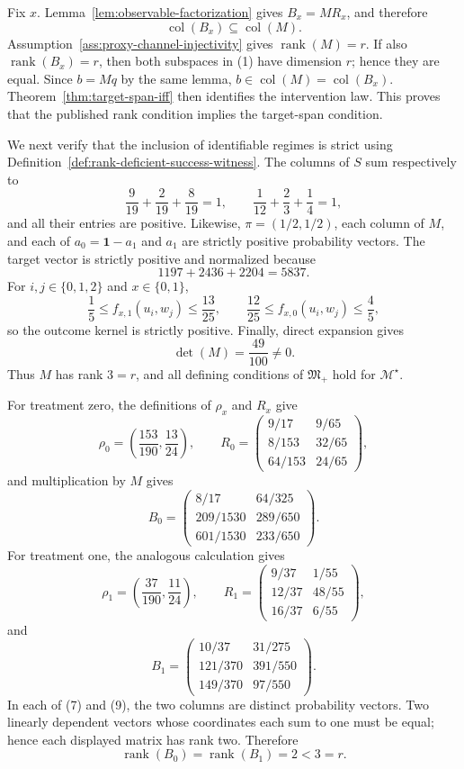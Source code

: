 Fix \(x\). Lemma~\ref{lem:observable-factorization} gives \(B_x=MR_x\), and therefore
\[
\operatorname{col}(B_x)\subseteq\operatorname{col}(M).
\tag{1}
\]
Assumption~\ref{ass:proxy-channel-injectivity} gives \(\operatorname{rank}(M)=r\). If also \(\operatorname{rank}(B_x)=r\), then both subspaces in (1) have dimension \(r\); hence they are equal. Since \(b=Mq\) by the same lemma, \(b\in\operatorname{col}(M)=\operatorname{col}(B_x)\). Theorem~\ref{thm:target-span-iff} then identifies the intervention law. This proves that the published rank condition implies the target-span condition.

We next verify that the inclusion of identifiable regimes is strict using Definition~\ref{def:rank-deficient-success-witness}. The columns of \(S\) sum respectively to
\[
\frac9{19}+\frac2{19}+\frac8{19}=1,
\qquad
\frac1{12}+\frac23+\frac14=1,
\tag{2}
\]
and all their entries are positive. Likewise, \(\pi=(1/2,1/2)\), each column of \(M\), and each of \(a_0=\mathbf 1-a_1\) and \(a_1\) are strictly positive probability vectors. The target vector is strictly positive and normalized because
\[
1197+2436+2204=5837.
\tag{3}
\]
For \(i,j\in\{0,1,2\}\) and \(x\in\{0,1\}\),
\[
\frac15\le f_{x,1}(u_i,w_j)\le\frac{13}{25},
\qquad
\frac{12}{25}\le f_{x,0}(u_i,w_j)\le\frac45,
\tag{4}
\]
so the outcome kernel is strictly positive. Finally, direct expansion gives
\[
\det(M)=\frac{49}{100}\ne0.
\tag{5}
\]
Thus \(M\) has rank \(3=r\), and all defining conditions of \(\mathfrak M_{+}\) hold for \(\mathcal M^{\star}\).

For treatment zero, the definitions of \(\rho_x\) and \(R_x\) give
\[
\rho_0=\left(\frac{153}{190},\frac{13}{24}\right),\qquad
R_0=
\begin{pmatrix}
9/17&9/65\\
8/153&32/65\\
64/153&24/65
\end{pmatrix},
\tag{6}
\]
and multiplication by \(M\) gives
\[
B_0=
\begin{pmatrix}
8/17&64/325\\
209/1530&289/650\\
601/1530&233/650
\end{pmatrix}.
\tag{7}
\]
For treatment one, the analogous calculation gives
\[
\rho_1=\left(\frac{37}{190},\frac{11}{24}\right),\qquad
R_1=
\begin{pmatrix}
9/37&1/55\\
12/37&48/55\\
16/37&6/55
\end{pmatrix},
\tag{8}
\]
and
\[
B_1=
\begin{pmatrix}
10/37&31/275\\
121/370&391/550\\
149/370&97/550
\end{pmatrix}.
\tag{9}
\]
In each of (7) and (9), the two columns are distinct probability vectors. Two linearly dependent vectors whose coordinates each sum to one must be equal; hence each displayed matrix has rank two. Therefore
\[
\operatorname{rank}(B_0)=\operatorname{rank}(B_1)=2<3=r.
\tag{10}
\]

